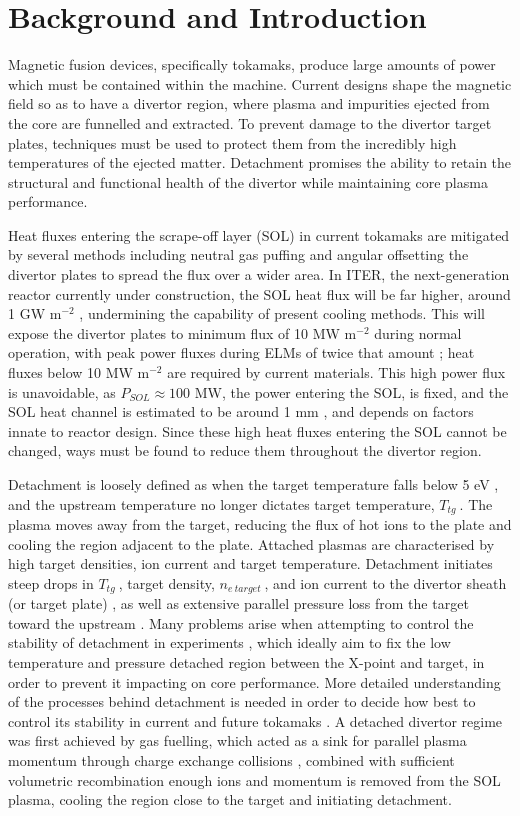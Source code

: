 \documentclass[12pt]{article}  %
\providecommand{\pow}[1]{{$^{#1}$}} %
\providecommand{\netarget}{$n_{e~target}~$} %
\providecommand{\Ttg}{$T_{tg}~$} %
\begin{document}
\newpage
\section{Background and Introduction}\label{secBg}
Magnetic fusion devices, specifically tokamaks, produce large amounts of power which must be contained within the machine. Current designs shape the magnetic field so as to have a divertor region, where plasma and impurities ejected from the core are funnelled and extracted. To prevent damage to the divertor target plates, techniques must be used to protect them from the incredibly high temperatures of the ejected matter. Detachment promises the ability to retain the structural and functional health of the divertor while maintaining core plasma performance. 

Heat fluxes entering the scrape-off layer (SOL) in current tokamaks are mitigated by several methods including neutral gas puffing and angular offsetting the divertor plates to spread the flux over a wider area. In ITER, the next-generation reactor currently under construction, the SOL heat flux will be far higher, around 1 GW m\pow{-2} \cite{Loarte2007}, undermining the capability of present cooling methods. This will expose the divertor plates to minimum flux of 10 MW m\pow{-2} during normal operation, with peak power fluxes during ELMs of twice that amount \cite{Loarte2007}; heat fluxes below 10 MW m\pow{-2} are required by current materials. This high power flux is unavoidable, as $ P_{SOL} \approx 100$ MW, the power entering the SOL, is fixed, and the SOL heat channel is estimated to be around 1 mm \cite{Eich2013}, and depends on factors innate to reactor design. Since these high heat fluxes entering the SOL cannot be changed, ways must be found to reduce them throughout the divertor region.

Detachment is loosely defined as when the target temperature falls below 5 eV \cite{Porter1996}, and the upstream temperature no longer dictates target temperature, \Ttg. The plasma moves away from the target, reducing the flux of hot ions to the plate and cooling the region adjacent to the plate. Attached plasmas are characterised by high target densities, ion current and target temperature. Detachment initiates steep drops in \Ttg, target density, \netarget, and ion current to the divertor sheath (or target plate) \cite{Stacey2001}, as well as extensive parallel pressure loss from the target toward the upstream \cite{Nakazawa2000}. Many problems arise when attempting to control the stability of detachment in experiments \cite{Lipschultz2016}, which ideally aim to fix the low temperature and pressure detached region between the X-point and target, in order to prevent it impacting on core performance. More detailed understanding of the processes behind detachment is needed in order to decide how best to control its stability in current and future tokamaks \cite{Reimold2015}. A detached divertor regime was first achieved by gas fuelling, which acted as a sink for parallel plasma momentum through charge exchange collisions \cite{Loarte1998}, combined with sufficient volumetric recombination \cite{Wischmeier2009} enough ions and momentum is removed from the SOL plasma, cooling the region close to the target and initiating detachment.
\end{document}
